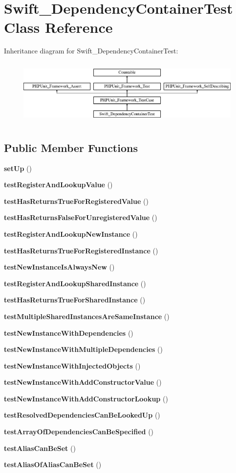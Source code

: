 \section{Swift\+\_\+\+Dependency\+Container\+Test Class Reference}
\label{class_swift___dependency_container_test}
Inheritance diagram for Swift\+\_\+\+Dependency\+Container\+Test\+:\begin{figure}[H]
\begin{center}
\leavevmode
\includegraphics[height=3.303835cm]{class_swift___dependency_container_test}
\end{center}
\end{figure}
\subsection*{Public Member Functions}
\begin{DoxyCompactItemize}
\item 
{\bf set\+Up} ()
\item 
{\bf test\+Register\+And\+Lookup\+Value} ()
\item 
{\bf test\+Has\+Returns\+True\+For\+Registered\+Value} ()
\item 
{\bf test\+Has\+Returns\+False\+For\+Unregistered\+Value} ()
\item 
{\bf test\+Register\+And\+Lookup\+New\+Instance} ()
\item 
{\bf test\+Has\+Returns\+True\+For\+Registered\+Instance} ()
\item 
{\bf test\+New\+Instance\+Is\+Always\+New} ()
\item 
{\bf test\+Register\+And\+Lookup\+Shared\+Instance} ()
\item 
{\bf test\+Has\+Returns\+True\+For\+Shared\+Instance} ()
\item 
{\bf test\+Multiple\+Shared\+Instances\+Are\+Same\+Instance} ()
\item 
{\bf test\+New\+Instance\+With\+Dependencies} ()
\item 
{\bf test\+New\+Instance\+With\+Multiple\+Dependencies} ()
\item 
{\bf test\+New\+Instance\+With\+Injected\+Objects} ()
\item 
{\bf test\+New\+Instance\+With\+Add\+Constructor\+Value} ()
\item 
{\bf test\+New\+Instance\+With\+Add\+Constructor\+Lookup} ()
\item 
{\bf test\+Resolved\+Dependencies\+Can\+Be\+Looked\+Up} ()
\item 
{\bf test\+Array\+Of\+Dependencies\+Can\+Be\+Specified} ()
\item 
{\bf test\+Alias\+Can\+Be\+Set} ()
\item 
{\bf test\+Alias\+Of\+Alias\+Can\+Be\+Set} ()
\end{DoxyCompactItemize}
